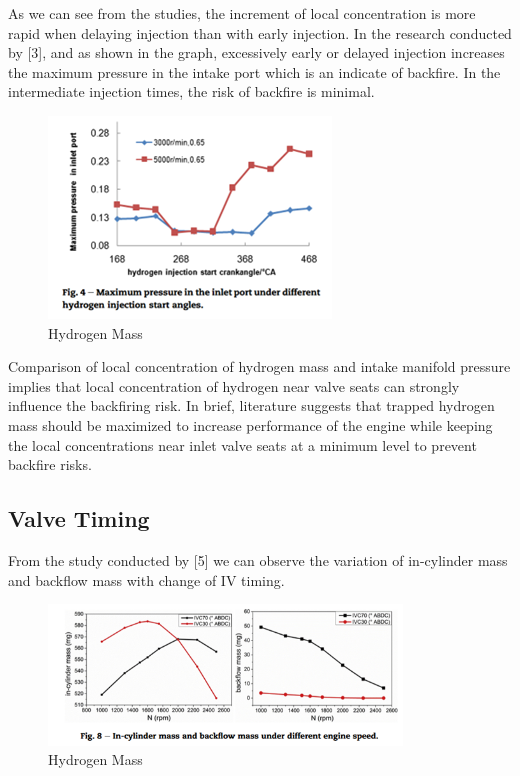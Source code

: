 \documentclass[conference]{IEEEtran}
\begin{document}
As we can see from the studies, the increment of local concentration is more rapid when delaying injection than with early injection.
In the research conducted by [3], and as shown in the graph, excessively early or delayed injection increases the maximum pressure in the intake port which is an indicate of backfire. In the intermediate injection times, the risk of backfire is minimal. 

\begin{figure}[htbp]
    \centerline{\includegraphics{figures/LR_IT_6.png}}
    \caption{Hydrogen Mass}
    \label{lr_it_6}
    \end{figure}

Comparison of local concentration of hydrogen mass and intake manifold pressure implies that local concentration of hydrogen near valve seats can strongly influence the backfiring risk. 
In brief, literature suggests that trapped hydrogen mass should be maximized to increase performance of the engine while keeping the local concentrations near inlet valve seats at a minimum level to prevent backfire risks.
    
\subsection{Valve Timing}

From the study conducted by [5] we can observe the variation of in-cylinder mass and backflow mass with change of IV timing.

\begin{figure}[htbp]
    \centerline{\includegraphics[width=94mm]{figures/LR_VT_1.png}}
    \caption{Hydrogen Mass}
    \label{lr_vt_1}
    \end{figure}
\end{document}
